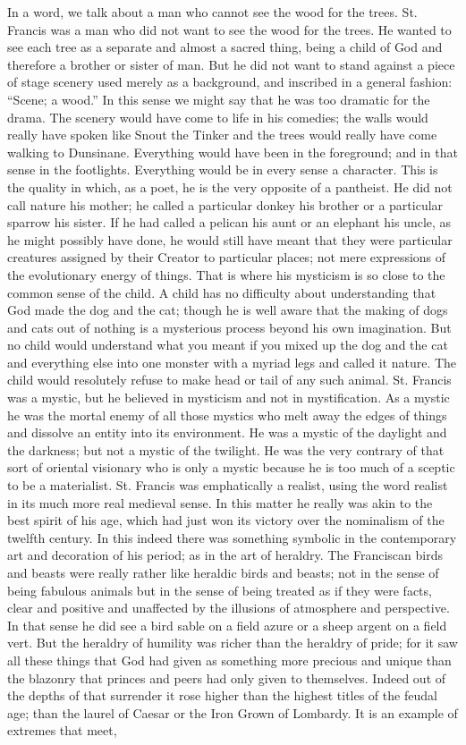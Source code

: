 \documentclass{book}
\begin{document}
In a word, we talk about a man who cannot see the wood for the trees. St. Francis was a man who did not want to see the wood for the trees. He wanted to see each tree as a separate and almost a sacred thing, being a child of God and therefore a brother or sister of man. But he did not want to stand against a piece of stage scenery used merely as a background, and inscribed in a general fashion: “Scene; a wood.” In this sense we might say that he was too dramatic for the drama. The scenery would have come to life in his comedies; the walls would really have spoken like Snout the Tinker and the trees would really have come walking to Dunsinane. Everything would have been in the foreground; and in that sense in the footlights. Everything would be in every sense a character. This is the quality in which, as a poet, he is the very opposite of a pantheist. He did not call nature his mother; he called a particular donkey his brother or a particular sparrow his sister. If he had called a pelican his aunt or an elephant his uncle, as he might possibly have done, he would still have meant that they were particular creatures assigned by their Creator to particular places; not mere expressions of the evolutionary energy of things. That is where his mysticism is so close to the common sense of the child. A child has no difficulty about understanding that God made the dog and the cat; though he is well aware that the making of dogs and cats out of nothing is a mysterious process beyond his own imagination. But no child would understand what you meant if you mixed up the dog and the cat and everything else into one monster with a myriad legs and called it nature. The child would resolutely refuse to make head or tail of any such animal. St. Francis was a mystic, but he believed in mysticism and not in mystification. As a mystic he was the mortal enemy of all those mystics who melt away the edges of things and dissolve an entity into its environment. He was a mystic of the daylight and the darkness; but not a mystic of the twilight. He was the very contrary of that sort of oriental visionary who is only a mystic because he is too much of a sceptic to be a materialist. St. Francis was emphatically a realist, using the word realist in its much more real medieval sense. In this matter he really was akin to the best spirit of his age, which had just won its victory over the nominalism of the twelfth century. In this indeed there was something symbolic in the contemporary art and decoration of his period; as in the art of heraldry. The Franciscan birds and beasts were really rather like heraldic birds and beasts; not in the sense of being fabulous animals but in the sense of being treated as if they were facts, clear and positive and unaffected by the illusions of atmosphere and perspective. In that sense he did see a bird sable on a field azure or a sheep argent on a field vert. But the heraldry of humility was richer than the heraldry of pride; for it saw all these things that God had given as something more precious and unique than the blazonry that princes and peers had only given to themselves. Indeed out of the depths of that surrender it rose higher than the highest titles of the feudal age; than the laurel of Caesar or the Iron Grown of Lombardy. It is an example of extremes that meet, 
\end{document}

